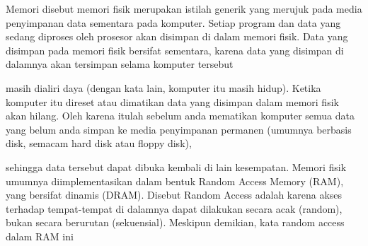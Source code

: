 
Memori disebut memori fisik merupakan istilah generik yang merujuk pada media penyimpanan data sementara pada komputer. Setiap program dan data yang sedang diproses oleh prosesor akan disimpan di dalam memori fisik. Data yang disimpan pada memori fisik bersifat sementara, karena data yang disimpan di dalamnya akan tersimpan selama komputer tersebut

masih dialiri daya (dengan kata lain, komputer itu masih hidup). Ketika komputer itu direset atau dimatikan data yang disimpan dalam memori fisik akan hilang. Oleh karena itulah sebelum anda mematikan komputer semua data yang belum anda simpan ke media penyimpanan permanen (umumnya berbasis disk, semacam hard disk atau floppy disk),

sehingga data tersebut dapat dibuka kembali di lain kesempatan. Memori fisik umumnya diimplementasikan dalam bentuk Random Access Memory (RAM), yang bersifat dinamis (DRAM). Disebut Random Access adalah karena akses terhadap tempat-tempat di dalamnya dapat dilakukan secara acak (random), bukan secara berurutan (sekuensial). Meskipun demikian, kata random access dalam RAM ini